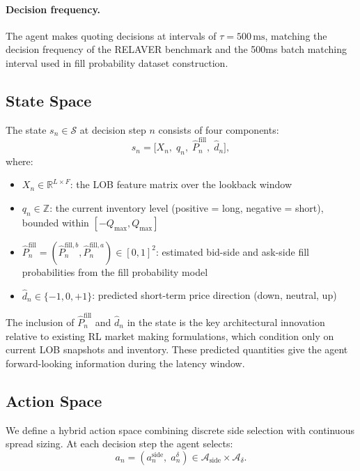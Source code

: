 \documentclass[12pt]{article}
\begin{document}
\paragraph{Decision frequency.} The agent makes quoting decisions at intervals of $\tau = 500\,\text{ms}$, matching the decision frequency of the RELAVER benchmark and the 500ms batch matching interval used in fill probability dataset construction.

\subsection{State Space}

The state $s_n \in \mathcal{S}$ at decision step $n$ consists of four components:
\begin{equation}
  s_n = \bigl[X_n,\; q_n,\; \hat{P}^{\mathrm{fill}}_n,\; \hat{d}_n\bigr],
\end{equation}
where:
\begin{itemize}[leftmargin=2em]
  \item $X_n \in \mathbb{R}^{L \times F}$: the LOB feature matrix over the lookback window
  \item $q_n \in \mathbb{Z}$: the current inventory level (positive = long, negative = short), bounded within $[-Q_{\max}, Q_{\max}]$
  \item $\hat{P}^{\mathrm{fill}}_n = (\hat{P}^{\mathrm{fill},b}_n, \hat{P}^{\mathrm{fill},a}_n) \in [0,1]^2$: estimated bid-side and ask-side fill probabilities from the fill probability model
  \item $\hat{d}_n \in \{-1, 0, +1\}$: predicted short-term price direction (down, neutral, up)
\end{itemize}

The inclusion of $\hat{P}^{\mathrm{fill}}_n$ and $\hat{d}_n$ in the state is the key architectural innovation relative to existing RL market making formulations, which condition only on current LOB snapshots and inventory. These predicted quantities give the agent forward-looking information during the latency window.

\subsection{Action Space}

We define a hybrid action space combining discrete side selection with continuous spread sizing. At each decision step the agent selects:
\begin{equation}
  a_n = (a^{\mathrm{side}}_n,\; a^{\delta}_n) \in \mathcal{A}_{\mathrm{side}} \times \mathcal{A}_{\delta}.
\end{equation}
\end{document}
